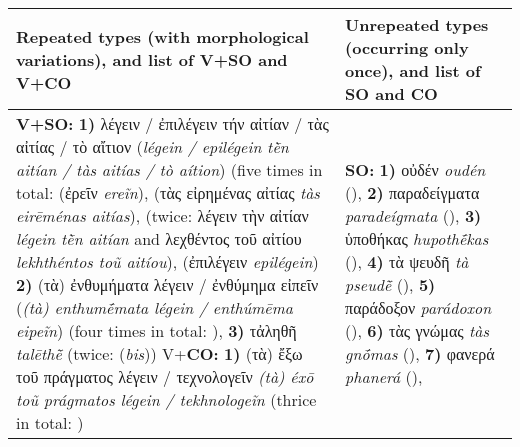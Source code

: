 \documentclass[output=paper,colorlinks,citecolor=brown]{langscibook}
\begin{document}
\begin{table}
\footnotesize
\begin{tabularx}{\textwidth}{QQ}
        \lsptoprule
        Repeated types (with morphological variations), and list of V+SO and V+CO & Unrepeated types (occurring only once), and list of SO and CO     \\
        \midrule
        \textbf{V+SO:}\newline
        \textbf{1)} λέγειν / ἐπιλέγειν τήν αἰτίαν / τὰς αἰτίας / τὸ αἴτιον (\textit{légein / epilégein tḕn aitían / tàs aitías / tò aítion}) (five times in total:  (ἐρεῖν \textit{ereĩn}),  (τὰς εἰρημένας αἰτίας \textit{tàs eirēménas aitías}),  (twice: λέγειν τὴν αἰτίαν \textit{légein tḕn aitían} and λεχθέντος τοῦ αἰτίου \textit{lekhthéntos toũ aitíou}),  (ἐπιλέγειν \textit{epilégein})\newline
        \textbf{2)} (τὰ) ἐνθυμήματα λέγειν / ἐνθύμημα εἰπεῖν (\textit{(tà) enthumḗmata légein / enthúmēma eipeĩn}) (four times in total: ),\newline
        \textbf{3)} τἀληθῆ \textit{talēthē̃} (twice:  (\textit{bis})) V+\textbf{CO:} \textbf{1)} (τὰ) ἔξω τοῦ πράγματος λέγειν / τεχνολογεῖν \textit{(tà) éxō toũ prágmatos légein / tekhnologeĩn} (thrice in total: )
        &
        \textbf{SO:}\newline
        \textbf{1)} οὐδέν \textit{oudén} (),\newline
        \textbf{2)} παραδείγματα \textit{paradeígmata} (),\newline
        \textbf{3)} ὑποθήκας \textit{hupothḗkas} (),\newline
        \textbf{4)} τὰ ψευδῆ \textit{tà pseudē̃} (),\newline
        \textbf{5)} παράδοξον \textit{parádoxon} (),\newline
        \textbf{6)} τὰς γνώμας \textit{tàs gnṓmas} (),\newline
        \textbf{7)} φανερά \textit{phanerá} (),\newline

\end{tabularx}
\end{table}
\end{document}
